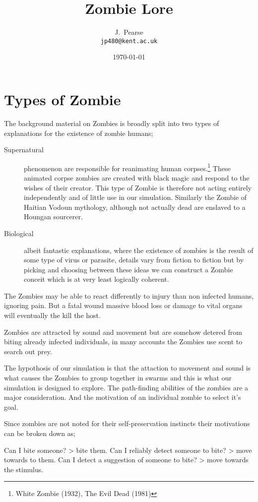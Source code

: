 \documentclass[a4paper,12pt]{article}
\begin{document}
\title{Zombie Lore}
\author{J.~Pearse\\{\small\tt jp480@kent.ac.uk}}
\date{\today}

\maketitle

\section{Types of Zombie}The background material on Zombies is broadly split into two types of explanations for the existence of zombie humans;
\begin{description}
\item[Supernatural] phenomenon are responsible for reanimating human corpses.\footnote{White Zombie (1932), The Evil Dead (1981)} These animated corpse zombies are created with black magic and respond to the wishes of their creator. This type of Zombie is therefore not acting entirely independently and of little use in our simulation. Similarly the Zombie of Haitian Vodoun mythology, although not actually dead are enslaved to a Houngan sourcerer.
\item[Biological] albeit fantastic explanations, where the existence of zombies is the result of some type of virus or parasite, details vary from fiction to fiction but by picking and choosing between these ideas we can construct a Zombie conceit which is at very least logically coherent.
\end{description}
The Zombies may be able to react differently to injury than non infected humans, ignoring pain. But a fatal wound massive blood loss or damage to vital organs will eventually the kill the host.

Zombies are attracted by sound and movement but are somehow detered from biting already infected individuals, in many accounts the Zombies use scent to search out prey.

The hypothosis of our simulation is that the attaction to movement and sound is what causes the Zombies to group together in swarms and this is what our simulation is designed to explore. The path-finding abilities of the zombies are a major consideration.
And the motivation of an individual zombie to select it's goal.

Since zombies are not noted for their self-preservation instincts their motivations can be broken down as;

Can I bite someone? > bite them.
Can I reliably detect someone to bite? > move towards to them.
Can I detect a suggestion of someone to bite? > move towards the stimulus.
\end{document}
